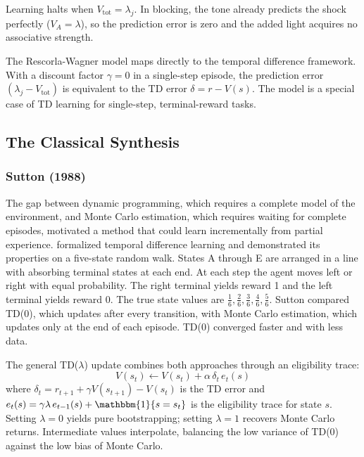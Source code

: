 Learning halts when $V_{\text{tot}} = \lambda_j$. In blocking, the tone already predicts the shock perfectly ($V_A = \lambda$), so the prediction error is zero and the added light acquires no associative strength.

The Rescorla-Wagner model maps directly to the temporal difference framework. With a discount factor $\gamma=0$ in a single-step episode, the prediction error $(\lambda_j - V_{\text{tot}})$ is equivalent to the TD error $\delta = r - V(s)$. The model is a special case of TD learning for single-step, terminal-reward tasks.


\subsection{The Classical Synthesis}

\subsubsection{Sutton (1988)}

The gap between dynamic programming, which requires a complete model of the environment, and Monte Carlo estimation, which requires waiting for complete episodes, motivated a method that could learn incrementally from partial experience. \citet{sutton1988} formalized temporal difference learning and demonstrated its properties on a five-state random walk. States A through E are arranged in a line with absorbing terminal states at each end. At each step the agent moves left or right with equal probability. The right terminal yields reward 1 and the left terminal yields reward 0. The true state values are $\frac{1}{6}, \frac{2}{6}, \frac{3}{6}, \frac{4}{6}, \frac{5}{6}$. Sutton compared TD(0), which updates after every transition, with Monte Carlo estimation, which updates only at the end of each episode. TD(0) converged faster and with less data.

The general TD($\lambda$) update combines both approaches through an eligibility trace:
\begin{equation}
V(s_t) \leftarrow V(s_t) + \alpha \, \delta_t \, e_t(s)
\end{equation}
where $\delta_t = r_{t+1} + \gamma V(s_{t+1}) - V(s_t)$ is the TD error and $e_t(s) = \gamma \lambda \, e_{t-1}(s) + \mathbbm{1}\{s = s_t\}$ is the eligibility trace for state $s$. Setting $\lambda = 0$ yields pure bootstrapping; setting $\lambda = 1$ recovers Monte Carlo returns. Intermediate values interpolate, balancing the low variance of TD(0) against the low bias of Monte Carlo.

